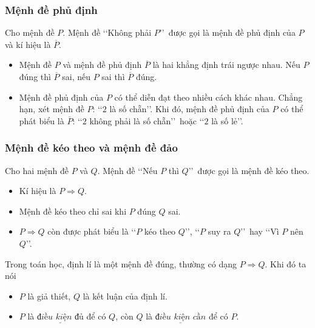 \begin{tomtat}
\subsubsection{Mệnh đề phủ định}

\begin{boxdn}{}
	Cho mệnh đề $P$. Mệnh đề \lq\lq  Không phải $P$\rq\rq\ được gọi là mệnh đề phủ định của $P$ và kí hiệu là $\overline{P}$.
	\begin{itemize}
		\item Mệnh đề $P$ và mệnh đề phủ định $\overline{P}$ là hai khẳng định trái ngược nhau. Nếu $P$ đúng thì $\overline{P}$ sai, nếu $P$ sai thì $\overline{P}$ đúng.
		\item Mệnh đề phủ định của $P$ có thể diễn đạt theo nhiều cách khác nhau. Chẳng hạn, xét mệnh đề $P$: \lq\lq  $2$ là số chẵn\rq\rq. Khi đó, mệnh đề phủ định của $P$ có thể phát biểu là $\overline{P}$: \lq\lq  $2$ không phải là số chẵn\rq\rq\ hoặc \lq\lq  $2$ là số lẻ\rq\rq.
	\end{itemize} 
\end{boxdn}

\subsubsection{Mệnh đề kéo theo và mệnh đề đảo}

\begin{boxdn}{}
	Cho hai mệnh đề $P$ và $Q$. Mệnh đề \lq\lq  Nếu $P$ thì $Q$\rq\rq\ được gọi là mệnh đề kéo theo.
	\begin{itemize}
		\item Kí hiệu là $P\Rightarrow Q.$
		\item Mệnh đề kéo theo chỉ sai khi $P$ đúng $Q$ sai.
		\item $P\Rightarrow Q$ còn được phát biểu là \lq\lq  $P$ kéo theo $Q$\rq\rq, \lq\lq  $P$ suy ra $Q$\rq\rq\ hay \lq\lq  Vì $P$ nên $Q$\rq\rq.
	\end{itemize}
\end{boxdn}

\begin{note}
	Trong toán học, định lí là một mệnh đề đúng, thường có dạng $P\Rightarrow Q$.
	Khi đó ta nói 
	\begin{itemize}
		\item $P$ là giả thiết, $Q$ là kết luận của định lí.
		\item $P$ là $\underline{\textit{điều kiện đủ}}$ để có $Q$, còn $Q$ là $\underline{\textit{điều kiện cần}}$ để có $P$.
	\end{itemize}
\end{note}


\end{tomtat}
